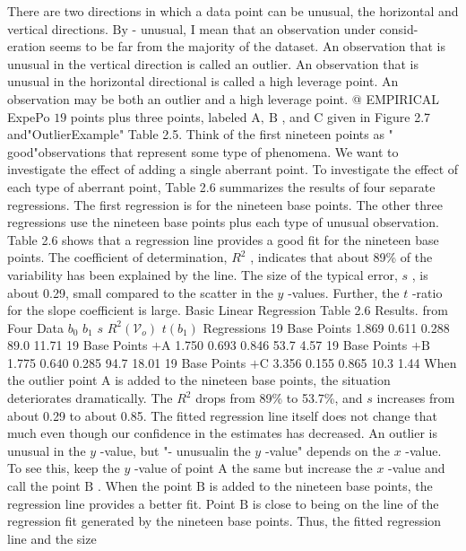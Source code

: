 \documentclass[11pt]{article}
\begin{document}
There are two directions in which a data point can be unusual, the horizontal
and vertical directions. \(\mathrm{B y}\) - unusual, I mean that an observation under consid-
eration seems to be far from the majority of the dataset. An observation that is
unusual in the vertical direction is called an outlier. An observation that is unusual
 in the horizontal directional is called a high leverage point. An observation may
 be both an outlier and a high leverage point.
@ EMPIRICAL
ExpePo
\(1 9\) points plus three points, labeled \(\mathrm{A , \ B}\) , and \(\mathrm{C}\) given in Figure 2.7 and"OutlierExample"
 Table 2.5. Think of the first nineteen points as " good"observations that represent
 some type of phenomena. We want to investigate the effect of adding a single
aberrant point.
To investigate the effect of each type of aberrant point, Table 2.6 summarizes
the results of four separate regressions. The first regression is for the nineteen
base points. The other three regressions use the nineteen base points plus each
 type of unusual observation.
Table 2.6 shows that a regression line provides a good fit for the nineteen
base points. The coefficient of determination, \(R^{2}\) , indicates that about 89\% of
 the variability has been explained by the line. The size of the typical error, \(s\) , is
about 0.29, small compared to the scatter in the \(y\) -values. Further, the \(t\) -ratio for
 the slope coefficient is large.
 Basic Linear Regression
Table 2.6 Results.
 from Four Data \(b_{0}\) \(b_{1}\) \(s\) \(R^{2} ( \mathcal{V}_{\! o} )\) \(t ( b_{1} )\)
Regressions
19 Base Points 1.869 0.611 0.288 89.0 11.71
19 Base Points \(+ \mathrm{A}\) 1.750 0.693 0.846 53.7 4.57
19 Base Points \(+ \mathrm{B}\) 1.775 \(0 . 6 4 0\) 0.285 94.7 18.01
19 Base Points \(+ \mathrm{C}\) 3.356 0.155 0.865 10.3 1.44
When the outlier point \(\mathrm{A}\) is added to the nineteen base points, the situation
 deteriorates dramatically. The \(R^{2}\) drops from 89\% to 53.7\%, and \(s\) increases from
about 0.29 to about 0.85. The fitted regression line itself does not change that
much even though our confidence in the estimates has decreased.
An outlier is unusual in the \(y\) -value, but "- unusualin the \(y\) -value" depends on
 the \(x\) -value. To see this, keep the \(y\) -value of point \(\mathrm{A}\) the same but increase the
\(x\) -value and call the point \(\mathrm{B}\) .
When the point \(\mathrm{B}\) is added to the nineteen base points, the regression line
provides a better fit. Point \(\mathrm{B}\) is close to being on the line of the regression fit
 generated by the nineteen base points. Thus, the fitted regression line and the size
\end{document}
